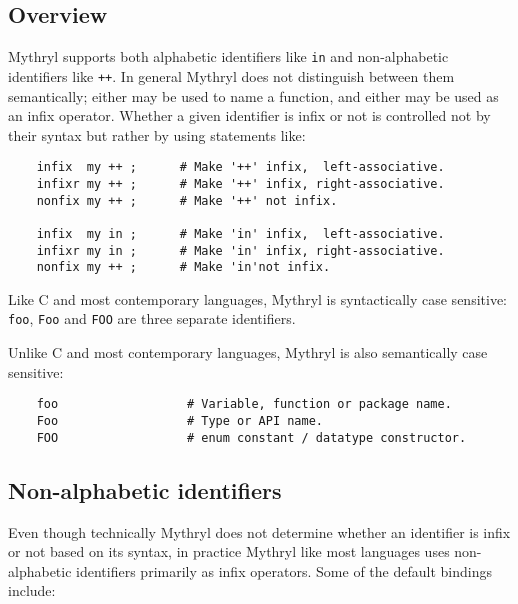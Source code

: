 
\subsection{Overview}
\label{section:ref:identifiers:overview}

Mythryl supports both alphabetic identifiers like {\tt in} and 
non-alphabetic identifiers like {\tt ++}.  In general Mythryl does 
not distinguish between them semantically;  either may be used to 
name a function, and either may be used as an infix operator. 
Whether a given identifier is infix or not is controlled not 
by their syntax but rather by using statements like:

\begin{verbatim}
    infix  my ++ ;      # Make '++' infix,  left-associative.
    infixr my ++ ;      # Make '++' infix, right-associative.
    nonfix my ++ ;      # Make '++' not infix.

    infix  my in ;      # Make 'in' infix,  left-associative.
    infixr my in ;      # Make 'in' infix, right-associative.
    nonfix my ++ ;      # Make 'in'not infix.
\end{verbatim}

Like C and most contemporary languages, Mythryl is syntactically 
case sensitive: {\tt foo}, {\tt Foo} and {\tt FOO} are three 
separate identifiers.

Unlike C and most contemporary languages, Mythryl is also 
semantically case sensitive:

\begin{verbatim}
    foo                  # Variable, function or package name.
    Foo                  # Type or API name.
    FOO                  # enum constant / datatype constructor.
\end{verbatim}

\cutend*

\subsection{Non-alphabetic identifiers}
\label{section:ref:identifiers:non-alphabetic}

Even though technically Mythryl does not determine 
whether an identifier is infix or not based on its 
syntax, in practice Mythryl like most languages 
uses non-alphabetic identifiers primarily as infix 
operators.  Some of the default bindings include:

